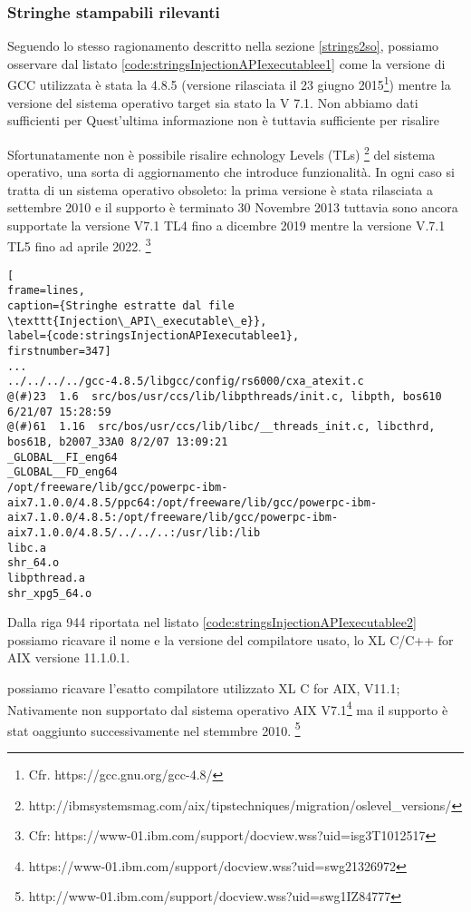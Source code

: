 \documentclass[10pt,a4paper, titlepage]{report}
\begin{document}
\subsubsection{Stringhe stampabili rilevanti}

Seguendo lo stesso ragionamento descritto nella sezione \ref{strings2so}, possiamo osservare dal listato \ref{code:stringsInjectionAPIexecutablee1} come la versione di GCC utilizzata è stata la 4.8.5 (versione rilasciata il 23 giugno 2015\footnote{Cfr. https://gcc.gnu.org/gcc-4.8/}) mentre la versione del sistema operativo target sia stato la V 7.1. 
Non abbiamo dati sufficienti per Quest'ultima informazione non è tuttavia sufficiente per risalire  


Sfortunatamente non è possibile risalire echnology Levels (TLs) \footnote{http://ibmsystemsmag.com/aix/tipstechniques/migration/oslevel\_versions/} del sistema operativo, una sorta di aggiornamento che introduce funzionalità. In ogni caso si tratta di un sistema operativo obsoleto: la prima versione è stata rilasciata a settembre 2010 e il supporto è terminato 30 Novembre 2013 tuttavia sono ancora supportate la versione V7.1 TL4 fino a dicembre 2019 mentre la versione V.7.1 TL5 fino ad aprile 2022. \footnote{Cfr: https://www-01.ibm.com/support/docview.wss?uid=isg3T1012517}




\begin{lstlisting}[
frame=lines, 
caption={Stringhe estratte dal file \texttt{Injection\_API\_executable\_e}}, 
label={code:stringsInjectionAPIexecutablee1},
firstnumber=347]
...
../../../../gcc-4.8.5/libgcc/config/rs6000/cxa_atexit.c
@(#)23  1.6  src/bos/usr/ccs/lib/libpthreads/init.c, libpth, bos610 6/21/07 15:28:59
@(#)61	1.16  src/bos/usr/ccs/lib/libc/__threads_init.c, libcthrd, bos61B, b2007_33A0 8/2/07 13:09:21
_GLOBAL__FI_eng64
_GLOBAL__FD_eng64
/opt/freeware/lib/gcc/powerpc-ibm-aix7.1.0.0/4.8.5/ppc64:/opt/freeware/lib/gcc/powerpc-ibm-aix7.1.0.0/4.8.5:/opt/freeware/lib/gcc/powerpc-ibm-aix7.1.0.0/4.8.5/../../..:/usr/lib:/lib
libc.a
shr_64.o
libpthread.a
shr_xpg5_64.o
\end{lstlisting}

Dalla riga 944 riportata nel listato \ref{code:stringsInjectionAPIexecutablee2} possiamo ricavare il nome e la versione del compilatore usato, lo XL C/C++ for AIX versione 11.1.0.1. 

possiamo ricavare l'esatto compilatore utilizzato XL C for AIX, V11.1; Nativamente non supportato dal sistema operativo AIX V7.1\footnote{https://www-01.ibm.com/support/docview.wss?uid=swg21326972} ma il supporto è stat oaggiunto successivamente nel stemmbre 2010. \footnote{http://www-01.ibm.com/support/docview.wss?uid=swg1IZ84777}
\end{document}
